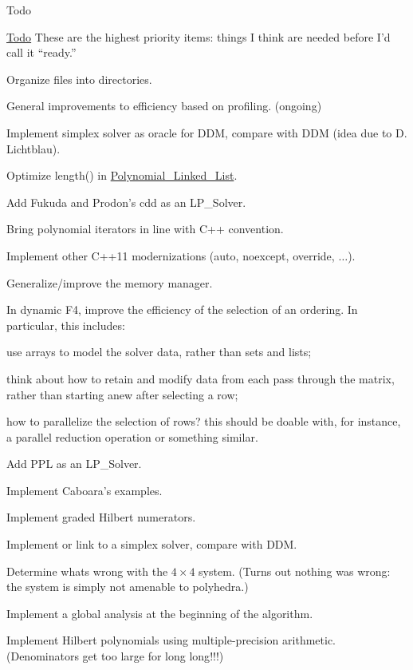 \begin{DoxyRefDesc}{Todo}
\item[\hyperlink{todo__todo000001}{Todo}]These are the highest priority items\+: things I think are needed before I'd call it ``ready.''
\begin{DoxyItemize}
\item Organize files into directories.
\item General improvements to efficiency based on profiling. (ongoing)
\item Implement simplex solver as oracle for D\+DM, compare with D\+DM (idea due to D. Lichtblau).
\item Optimize length() in \hyperlink{group__polygroup_class_polynomial___linked___list}{Polynomial\+\_\+\+Linked\+\_\+\+List}.
\item Add Fukuda and Prodon's cdd as an L\+P\+\_\+\+Solver. \cite{Fukuda_DoubleDescriptionRevisited}
\item Bring polynomial iterators in line with C++ convention.
\item Implement other C++11 modernizations ({\ttfamily auto}, {\ttfamily noexcept}, {\ttfamily override}, {$\dots$}).
\item Generalize/improve the memory manager.
\item In dynamic F4, improve the efficiency of the selection of an ordering. In particular, this includes\+:
\begin{DoxyItemize}
\item use arrays to model the solver data, rather than sets and lists;
\item think about how to retain and modify data from each pass through the matrix, rather than starting anew after selecting a row;
\item how to parallelize the selection of rows? this should be doable with, for instance, a parallel reduction operation or something similar.
\end{DoxyItemize}
\item Add P\+PL as an L\+P\+\_\+\+Solver. \cite{BagnaraHZ08SCP}
\item Implement Caboara's examples.
\item Implement graded Hilbert numerators.
\item Implement or link to a simplex solver, compare with D\+DM.
\item Determine what\textquotesingle{}s wrong with the $4\times4$ system. (Turns out nothing was wrong\+: the system is simply not amenable to polyhedra.)
\item Implement a global analysis at the beginning of the algorithm.
\item Implement Hilbert polynomials using multiple-\/precision arithmetic. (Denominators get too large for {\ttfamily long long}!!!)
\end{DoxyItemize}\end{DoxyRefDesc}
